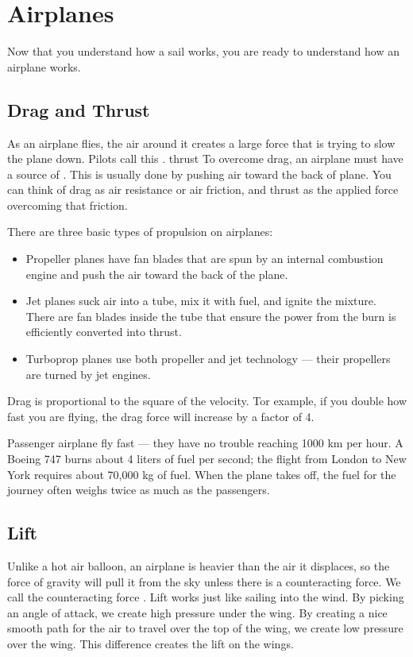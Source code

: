 \chapter{Airplanes}

Now that you understand how a sail works,  you are ready to understand how an airplane works.   

\section{Drag and Thrust}

As an airplane flies, the air around it creates a large force that is trying to slow the 
plane down.  Pilots call this .
{thrust}
To overcome drag, an airplane must have a source of .  This is usually done by pushing air toward the back of plane. You can think of drag as air resistance or air friction, and thrust as the applied force overcoming that friction.

There are three basic types of propulsion on airplanes:

\begin{itemize}
\item Propeller planes have fan blades that are spun by an internal combustion engine and push the air toward the back of the plane.  
\item Jet planes suck air into a tube,  mix it with fuel,  and ignite the mixture.  There are fan blades inside the tube that ensure
the power from the burn is efficiently converted into thrust.
\item Turboprop planes use both propeller and jet technology --- their propellers are turned by jet engines.
\end{itemize}
Drag is proportional to the square of the velocity. Tor example, if you double how fast you are flying, the drag force will increase by a factor of 4. 

Passenger airplane fly fast --- they have no trouble reaching 1000 km per hour. A Boeing 747 burns about 4 liters of fuel per second; the flight from London to New York requires about 70,000 kg of fuel.  When the plane takes off,  the fuel for the journey often weighs twice as much as the passengers.
 
\section{Lift}

Unlike a hot air balloon, an airplane is heavier than the 
air it displaces, so the force of gravity will pull it from the sky unless there is a counteracting force.  We call the counteracting force .
Lift works just like sailing into the wind. By picking an angle of attack, we create high pressure under the wing.  By creating a nice smooth path for the 
air to travel over the top of the wing,  we create low pressure over the wing.  This difference creates the lift on the wings.

